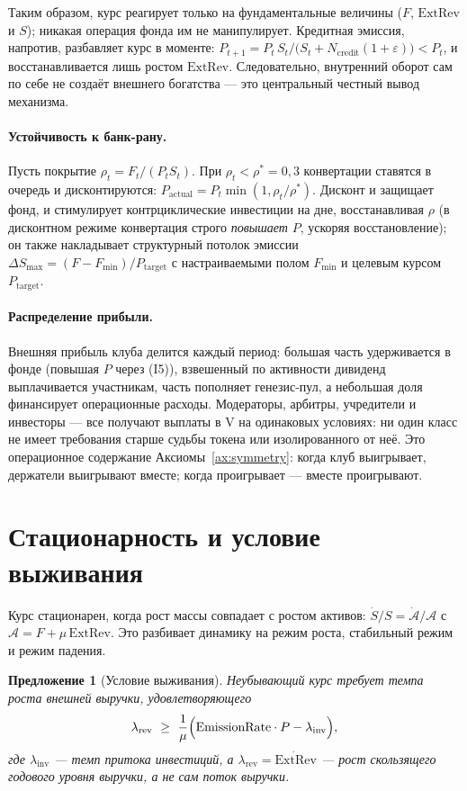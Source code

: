\documentclass[11pt]{article}
\theoremstyle{plain}
\newtheorem{proposition}{Предложение}
\theoremstyle{definition}
\theoremstyle{remark}
\newcommand{\V}{\mathrm{V}}
\newcommand{\ExtRev}{\mathrm{ExtRev}}
\begin{document}
Таким образом, курс реагирует только на фундаментальные величины ($F$, $\ExtRev$ и $S$); никакая операция фонда им не манипулирует. Кредитная эмиссия, напротив, разбавляет курс в моменте: $P_{t+1} = P_t\, S_t / \bigl(S_t + N_{\mathrm{credit}}(1+\varepsilon)\bigr) < P_t$, и восстанавливается лишь ростом $\ExtRev$. Следовательно, внутренний оборот сам по себе не создаёт внешнего богатства --- это центральный честный вывод механизма.

\paragraph{Устойчивость к банк-рану.} Пусть покрытие $\rho_t = F_t/(P_t S_t)$. При $\rho_t < \rho^* = 0{,}3$ конвертации ставятся в очередь и дисконтируются: $P_{\mathrm{actual}} = P_t \min(1, \rho_t/\rho^*)$. Дисконт и защищает фонд, и стимулирует контрциклические инвестиции на дне, восстанавливая $\rho$ (в дисконтном режиме конвертация строго \emph{повышает} $P$, ускоряя восстановление); он также накладывает структурный потолок эмиссии $\Delta S_{\max} = (F - F_{\min})/P_{\mathrm{target}}$ с настраиваемыми полом $F_{\min}$ и целевым курсом $P_{\mathrm{target}}$.

\paragraph{Распределение прибыли.} Внешняя прибыль клуба делится каждый период: большая часть удерживается в фонде (повышая $P$ через (I5)), взвешенный по активности дивиденд выплачивается участникам, часть пополняет генезис-пул, а небольшая доля финансирует операционные расходы. Модераторы, арбитры, учредители и инвесторы --- все получают выплаты в $\V$ на одинаковых условиях: ни один класс не имеет требования старше судьбы токена или изолированного от неё. Это операционное содержание Аксиомы~\ref{ax:symmetry}: когда клуб выигрывает, держатели выигрывают вместе; когда проигрывает --- вместе проигрывают.

\section{Стационарность и условие выживания}

Курс стационарен, когда рост массы совпадает с ростом активов: $\dot S/S = \dot{\mathcal{A}}/\mathcal{A}$ с $\mathcal{A} = F + \mu\,\ExtRev$. Это разбивает динамику на режим роста, стабильный режим и режим падения.

\begin{proposition}[Условие выживания]\label{prop:survival}
Неубывающий курс требует темпа роста внешней выручки, удовлетворяющего
\[
\lambda_{\mathrm{rev}} \ \ge\ \frac{1}{\mu}\Bigl(\mathrm{EmissionRate}\cdot P - \lambda_{\mathrm{inv}}\Bigr),
\]
где $\lambda_{\mathrm{inv}}$ --- темп притока инвестиций, а $\lambda_{\mathrm{rev}}=\dot{\ExtRev}$ --- \emph{рост} скользящего годового уровня выручки, а не сам поток выручки.
\end{proposition}
\end{document}
